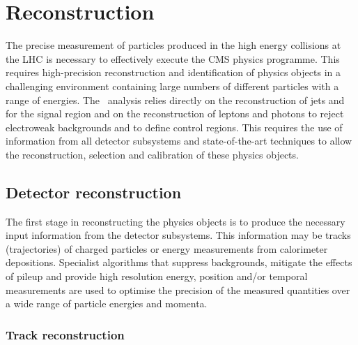 \chapter{Reconstruction} %
\label{cha:reco}

The precise measurement of particles produced in the high energy collisions at the LHC 
is necessary to effectively execute the CMS physics programme. This requires high-precision
reconstruction and identification of physics objects in a challenging environment containing
large numbers of different particles with a range of energies. The \alphat~analysis 
relies directly on the reconstruction of jets and \met for the signal region and on the 
reconstruction of leptons and photons to reject electroweak 
backgrounds and to define control regions.
This requires the use of information from all detector subsystems and state-of-the-art
techniques to allow the reconstruction, selection and calibration of these physics objects.


\section{Detector reconstruction}

The first stage in reconstructing the physics objects is to produce the necessary
input information from the detector subsystems. This information may be tracks
(trajectories) of charged particles or energy measurements from calorimeter depositions. 
Specialist algorithms that suppress backgrounds, mitigate the effects of pileup and provide high resolution energy,
position and/or temporal measurements are used to optimise the precision of the 
measured quantities over a wide range of particle energies and momenta.

\subsection{Track reconstruction}


